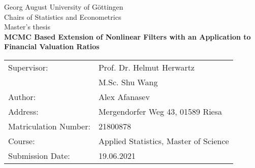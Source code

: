 \begin{titlepage}
	\begin{center}
	\vspace*{4cm}
	{\LARGE Georg August University of Göttingen}\\
	\vskip 1.5cm
	{\large Chairs of Statistics and Econometrics}\\
	\vskip 0.5cm
	{\large Master's thesis}\\
	\vskip 2.0cm
	{\LARGE\textbf{MCMC Based Extension of Nonlinear Filters with an Application to Financial Valuation Ratios}}\\
	\end{center}
\vfill
\vfill
\begin{tabular}{ll}
	Supervisor: & Prof. Dr. Helmut Herwartz \\
	& M.Sc. Shu Wang\\
	Author: & Alex Afanasev \\
	Address: & Mergendorfer Weg 43, 01589 Riesa \\
	Matriculation Number: & 21800878 \\
	Course: & Applied Statistics, Master of Science \\
	Submission Date: & 19.06.2021 \\
\end{tabular}
\end{titlepage}
